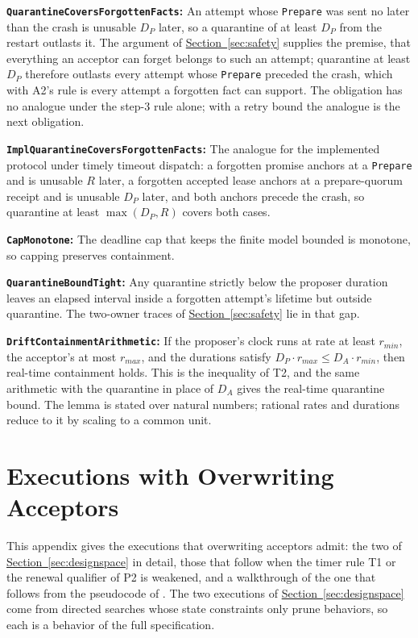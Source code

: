 \documentclass[final,5p,times,twocolumn,number]{elsarticle}
\newcommand{\code}[1]{\texttt{#1}}
\newcommand{\invitem}[1]{\smallskip\noindent\textbf{#1:} }
\newcommand{\secref}[1]{\hyperref[#1]{Section~\ref*{#1}}}
\begin{document}
\invitem{\code{QuarantineCoversForgottenFacts}}An attempt whose \code{Prepare} was sent no later than the crash is unusable $D_P$ later, so a quarantine of at least $D_P$ from the restart outlasts it.  The argument of \secref{sec:safety} supplies the premise, that everything an acceptor can forget belongs to such an attempt; quarantine at least $D_P$ therefore outlasts every attempt whose \code{Prepare} preceded the crash, which with A2's rule is every attempt a forgotten fact can support.  The obligation has no analogue under the step-3 rule alone; with a retry bound the analogue is the next obligation.

\invitem{\code{ImplQuarantineCoversForgottenFacts}}The analogue for the implemented protocol under timely timeout dispatch: a forgotten promise anchors at a \code{Prepare} and is unusable $R$ later, a forgotten accepted lease anchors at a prepare-quorum receipt and is unusable $D_P$ later, and both anchors precede the crash, so quarantine at least $\max(D_P, R)$ covers both cases.

\invitem{\code{CapMonotone}}The deadline cap that keeps the finite model bounded is monotone, so capping preserves containment.

\invitem{\code{QuarantineBoundTight}}Any quarantine strictly below the proposer duration leaves an elapsed interval inside a forgotten attempt's lifetime but outside quarantine.  The two-owner traces of \secref{sec:safety} lie in that gap.

\invitem{\code{DriftContainmentArithmetic}}If the proposer's clock runs at rate at least $r_{min}$, the acceptor's at most $r_{max}$, and the durations satisfy $D_P \cdot r_{max} \leq D_A \cdot r_{min}$, then real-time containment holds.  This is the inequality of T2, and the same arithmetic with the quarantine in place of $D_A$ gives the real-time quarantine bound.  The lemma is stated over natural numbers; rational rates and durations reduce to it by scaling to a common unit.

\section{Executions with Overwriting Acceptors}\label{app:latetimer}

This appendix gives the executions that overwriting acceptors admit: the two of \secref{sec:designspace} in detail, those that follow when the timer rule T1 or the renewal qualifier of P2 is weakened, and a walkthrough of the one that follows from the pseudocode of \cite{ref1}.  The two executions of \secref{sec:designspace} come from directed searches whose state constraints only prune behaviors, so each is a behavior of the full specification.
\end{document}
